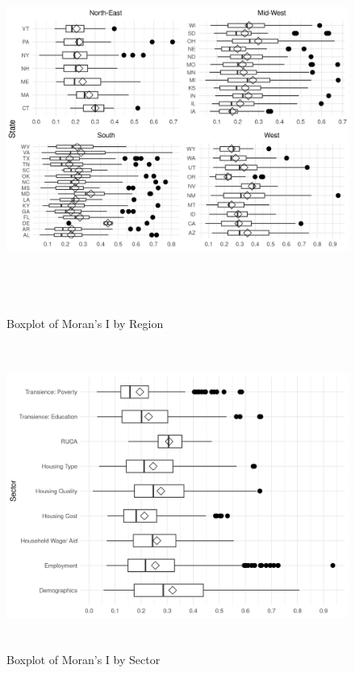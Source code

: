 \begin{figure}[htbp]
    \centering
     \includegraphics[width=1\textwidth, height=12cm]{plots/moran_state.png}
     \caption{Boxplot of Moran's I by Region}
     \label{fig:moran_region}
 \end{figure}

 \begin{figure}[htbp]
    \centering
     \includegraphics[width=1\textwidth, height=10cm]{plots/moran_sector}
     \caption{Boxplot of Moran's I by Sector}
     \label{fig:moran_sector}
 \end{figure}


